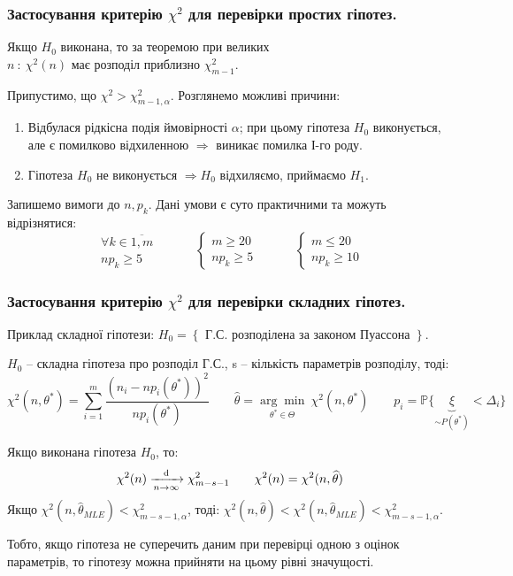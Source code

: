\subsubsection{Застосування критерію \( \chi^2 \) для перевірки простих гіпотез.}
Якщо \( H_0 \) виконана, то за теоремою при великих \( n \ : \
\chi^2(n) \text{ має розподіл приблизно } \chi^2_{m-1}\). \par
Припустимо, що \(  \chi^2  > \chi_{m-1, \alpha}^2 \). Розглянемо можливі причини:
\begin{enumerate}
  \item Відбулася рідкісна подія ймовірності \( \alpha \); при цьому гіпотеза \( H_0 \) виконується, але є помилково відхиленною \( \Longrightarrow  \) виникає помилка І-го роду.
  \item Гіпотеза \( H_0 \) не виконується \( \Longrightarrow   H_0 \) відхиляємо, приймаємо \( H_1 \).
\end{enumerate}
Запишемо вимоги до $n, p_k$. Дані умови є суто практичними та можуть відрізнятися:
\[
 \begin{gathered}
  \forall k \in \overline{1, m}\\
np_k \geq 5
 \end{gathered} \qquad\quad \begin{cases}
  m \geq 20 \\
  np_k \geq  5
 \end{cases}
 \qquad \quad
 \begin{cases}
  m \leq 20 \\
  np_k \geq  10
 \end{cases}
\]
\subsubsection{Застосування критерію \( \chi^2 \) для перевірки складних гіпотез.}
Приклад складної гіпотези:
\(
 H_0 = \left\lbrace
\text{ Г.С. розподілена за законом Пуассона }
  \right\rbrace
\).\par
\( H_0 \) -- складна гіпотеза про розподіл Г.С.,
s -- кількість параметрів розподілу, тоді:
\[
 \chi^2 (n, \theta^*) =  \sum\limits_{i=1}^{m}{
 \frac{(n_i - np_i(\theta^*))^2}{np_i (\theta^*)}
 } \qquad \widehat{\theta} = \underset{\theta^* \in \Theta}{\arg \min}\ \chi^2 (n, \theta^*) \qquad p_i = \mathbb{P} \lbrace \!\!\!\underbrace{\xi}_{\sim P(\theta^*)}\!\!\!  < \Delta_i \rbrace
\]

\begin{boxteo}
Якщо виконана гіпотеза \( H_0 \), то:
\[
  \chi^2 (n) \xrightarrow[n\to\infty]{\mathrm{d}}  \chi^2_{m-s-1} \qquad \chi^2 (n) = \chi^2(n, \widehat{\theta})
\]
Якщо \( \chi^2(n, \widehat{\theta}_{MLE}) < \chi^2_{m-s-1, \alpha} \), тоді:
\(
  \chi^2(n, \widehat{\theta}) <  \chi^2(n, \widehat{\theta}_{MLE})  < \chi^2_{m-s-1, \alpha}
\). \par
Тобто, якщо гіпотеза не суперечить даним при перевірці одною з оцінок параметрів, то гіпотезу можна прийняти на цьому рівні значущості.
\end{boxteo}
